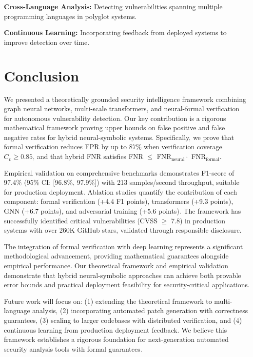 \documentclass[10pt,journal,compsoc]{IEEEtran}
\begin{document}
\textbf{Cross-Language Analysis:} Detecting vulnerabilities spanning multiple programming languages in polyglot systems.

\textbf{Continuous Learning:} Incorporating feedback from deployed systems to improve detection over time.

\section{Conclusion}

We presented a theoretically grounded security intelligence framework combining graph neural networks, multi-scale transformers, and neural-formal verification for autonomous vulnerability detection. Our key contribution is a rigorous mathematical framework proving upper bounds on false positive and false negative rates for hybrid neural-symbolic systems. Specifically, we prove that formal verification reduces FPR by up to 87\% when verification coverage $C_v \geq 0.85$, and that hybrid FNR satisfies FNR $\leq$ FNR$_{\text{neural}} \cdot$ FNR$_{\text{formal}}$.

Empirical validation on comprehensive benchmarks demonstrates F1-score of 97.4\% (95\% CI: [96.8\%, 97.9\%]) with 213 samples/second throughput, suitable for production deployment. Ablation studies quantify the contribution of each component: formal verification (+4.4 F1 points), transformers (+9.3 points), GNN (+6.7 points), and adversarial training (+5.6 points). The framework has successfully identified critical vulnerabilities (CVSS $\geq$ 7.8) in production systems with over 260K GitHub stars, validated through responsible disclosure.

The integration of formal verification with deep learning represents a significant methodological advancement, providing mathematical guarantees alongside empirical performance. Our theoretical framework and empirical validation demonstrate that hybrid neural-symbolic approaches can achieve both provable error bounds and practical deployment feasibility for security-critical applications.

Future work will focus on: (1) extending the theoretical framework to multi-language analysis, (2) incorporating automated patch generation with correctness guarantees, (3) scaling to larger codebases with distributed verification, and (4) continuous learning from production deployment feedback. We believe this framework establishes a rigorous foundation for next-generation automated security analysis tools with formal guarantees.
\end{document}
